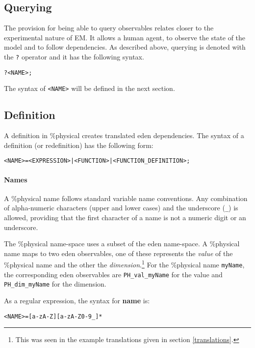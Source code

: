\documentclass[a4paper]{article}
\begin{document}
\subsection{Querying}
The provision for being able to query observables relates closer to 
the experimental nature of EM. It allows a human agent, to observe the
state of the model and to follow dependencies. As described above, querying is
denoted with the \texttt{?} operator and it has the following syntax.

\begin{alltt}
? <NAME> ;
\end{alltt}

The syntax of \texttt{<NAME>} will be defined in the next section.

\subsection{Definition}

A definition in \%physical creates translated
eden dependencies. The syntax of a definition (or redefinition)
has the following form:

\begin{alltt}
<NAME> = <EXPRESSION> | <FUNCTION> | <FUNCTION_DEFINITION> ;
\end{alltt}

\paragraph{Names}
A \%physical name follows standard variable name conventions. Any combination
of alpha-numeric characters (upper and lower cases) and the underscore 
(\texttt{\_}) is allowed, providing that the first character of a name is not a 
numeric digit or an underscore.

The \%physical name-space uses a subset of the eden name-space. A \%physical
name maps to two eden observables, one of these represents the \emph{value}
of the  \%physical name and the other the \emph{dimension}.\footnote{This was 
seen in the example
translations given in section \ref{translations}.} 
For the \%physical name \texttt{myName}, the corresponding eden observables
are \texttt{PH\_val\_myName} for the value and \texttt{PH\_dim\_myName} for the
dimension.

As a regular expression, the syntax for \textbf{name} is:

\begin{alltt}
<NAME> = [a-zA-Z][a-zA-Z0-9_]*
\end{alltt}
\end{document}
